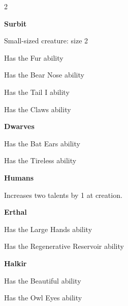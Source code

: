 \begin{multicols}{2}

\textbf{\large Surbit}
\begin{proplist}
\item Small-sized creature: size 2
\item Has the Fur ability
\item Has the Bear Nose ability
\item Has the Tail I ability
\item Has the Claws ability
\end{proplist}

\textbf{\large Dwarves}
\begin{proplist}
\item Has the Bat Ears ability
\item Has the Tireless ability
\end{proplist}

\textbf{\large Humans}
\begin{proplist}
\item Increases two talents by 1 at creation.
\end{proplist}

\textbf{\large Erthal}
\begin{proplist}
\item Has the Large Hands ability
\item Has the Regenerative Reservoir ability
\end{proplist}

\textbf{\large Halkir}
\begin{proplist}
\item Has the Beautiful ability
\item Has the Owl Eyes ability
\end{proplist}






\end{multicols}
